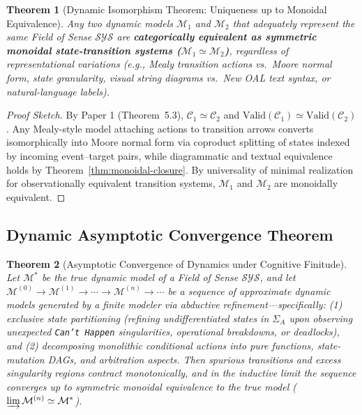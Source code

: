 \documentclass[11pt,a4paper]{article}
\theoremstyle{definition}
\theoremstyle{plain}
\newtheorem{theorem}{Theorem}[section]
\theoremstyle{remark}
\newcommand{\Valid}{\mathrm{Valid}}
\begin{document}
\begin{theorem}[Dynamic Isomorphism Theorem: Uniqueness up to Monoidal Equivalence]\label{thm:dyn-iso}
Any two dynamic models $\mathcal{M}_1$ and $\mathcal{M}_2$ that adequately represent the same Field of Sense $\mathcal{SYS}$ are \textbf{categorically equivalent as symmetric monoidal state-transition systems ($\mathcal{M}_1 \simeq \mathcal{M}_2$)}, regardless of representational variations (e.g., Mealy transition actions vs.\ Moore normal form, state granularity, visual string diagrams vs.\ New OAL text syntax, or natural-language labels).
\end{theorem}

\begin{proof}[Proof Sketch]
By Paper 1 (Theorem~5.3), $\mathcal{C}_1 \simeq \mathcal{C}_2$ and $\Valid(\mathcal{C}_1) \simeq \Valid(\mathcal{C}_2)$. Any Mealy-style model attaching actions to transition arrows converts isomorphically into Moore normal form via coproduct splitting of states indexed by incoming event--target pairs, while diagrammatic and textual equivalence holds by Theorem~\ref{thm:monoidal-closure}. By universality of minimal realization for observationally equivalent transition systems, $\mathcal{M}_1$ and $\mathcal{M}_2$ are monoidally equivalent.
\end{proof}

\subsection{Dynamic Asymptotic Convergence Theorem}

\begin{theorem}[Asymptotic Convergence of Dynamics under Cognitive Finitude]\label{thm:dyn-conv}
Let $\mathcal{M}^*$ be the true dynamic model of a Field of Sense $\mathcal{SYS}$, and let $\mathcal{M}^{(0)} \to \mathcal{M}^{(1)} \to \cdots \to \mathcal{M}^{(n)} \to \cdots$ be a sequence of approximate dynamic models generated by a finite modeler via abductive refinement---specifically: (1) exclusive state partitioning (refining undifferentiated states in $\Sigma_A$ upon observing unexpected \texttt{Can't Happen} singularities, operational breakdowns, or deadlocks), and (2) decomposing monolithic conditional actions into pure functions, state-mutation DAGs, and arbitration aspects. Then spurious transitions and excess singularity regions contract monotonically, and in the inductive limit the sequence converges up to symmetric monoidal equivalence to the true model ($\varinjlim \mathcal{M}^{(n)} \simeq \mathcal{M}^*$).
\end{theorem}
\end{document}

